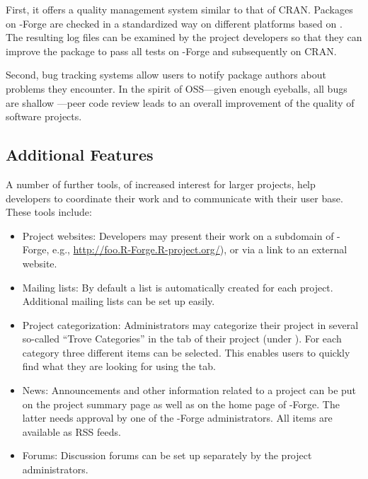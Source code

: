 First, it offers a quality management system similar to 
that of CRAN. Packages on \R{}-Forge are checked in a
standardized way on different platforms based on
. The resulting log files can be examined by the
project developers so that they can improve
the package to pass all tests on \R{}-Forge and subsequently on CRAN.

Second, bug tracking systems allow users to notify
package authors about problems they encounter. In the spirit of
OSS---given enough eyeballs, all bugs are shallow
\citep{forge:Raymond:1999}---peer code review leads to an 
overall improvement of the quality of software projects.

\subsection{Additional Features}

A number of further tools, of increased interest for larger
projects, help developers to coordinate their work and to communicate
with their user base. These tools include:

\begin{itemize}
\item Project websites: Developers may present their work
  on a subdomain of \R{}-Forge, e.g.,
  \url{http://foo.R-Forge.R-project.org/}), or via a link to an
  external website.
\item Mailing lists: By default a list
   is automatically
  created for each project. Additional mailing lists can be
  set up easily.
\item Project categorization: Administrators may categorize their
  project in several so-called ``Trove Categories'' in the 
  tab of their project (under ). For each
  category three different items can be selected. This enables users
  to quickly find what they are looking for using the 
  tab.
\item News: Announcements and other information related to a project
  can be put on the project summary page as well as on the 
  home page of \R{}-Forge. The latter needs approval by one of the \R{}-Forge
  administrators. All items are available as RSS feeds.
\item Forums: Discussion forums can be set up separately by the
  project administrators.%
\end{itemize}

